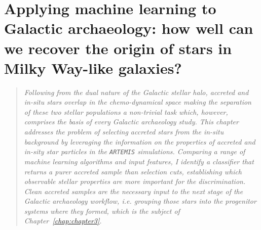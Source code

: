 ﻿%
%

\graphicspath{{Chapter_2_paper_folder/}}

\chapter[Machine learning for accreted vs.\ in-situ classification]{Applying
machine learning to Galactic archaeology: how well can we recover the origin of
stars in Milky Way-like galaxies?}
\label{chap:chapter2}



\begin{quote}
\itshape
Following from the dual nature of the Galactic stellar halo,
accreted and in-situ stars overlap in the chemo-dynamical space
making the separation of these two stellar populations a non-trivial task which, however,
comprises the basis of every Galactic archaeology study.
This chapter addresses the problem of selecting accreted stars from the in-situ background by
leveraging the information on the properties of accreted and in-sity star particles in
the \texttt{ARTEMIS} simulations.
Comparing a range of machine learning algorithms and input features, I identify a classifier that returns a
purer accreted sample than selection cuts, establishing which observable stellar properties
are more important for the discrimination.
Clean accreted samples are the necessary input to the next stage of
the Galactic archaeology workflow, i.e. grouping those stars into the progenitor systems where they
formed, which is the subject of Chapter~\ref{chap:chapter3}.
\end{quote}

